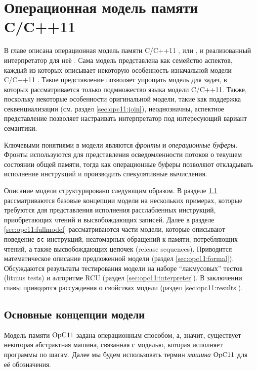 \chapter{Операционная модель памяти C/C++11} \label{sec:opc11}
В главе описана операционная модель памяти C/C++11 \cite{Podkopaev-al:CoRR16}, или \OpCpp,
и реализованный интерпретатор для неё \cite{opCppCode}.
Сама модель представлена как семейство аспектов, каждый из которых описывает некоторую особенность
изначальной модели C/C++11 \cite{Batty-al:POPL11}.
Такое представление позволяет упрощать модель для задач, в которых рассматривается только подмножество
языка модели C/C++11.
Также, поскольку некоторые особенности оригинальной модели, такие как поддержка секвенциализации (см. раздел \ref{sec:opc11:join}),
неоднозначны, аспектное представление позволяет настраивать интерпретатор под интересующий вариант семантики.

Ключевыми понятиями в модели являются \emph{фронты} и \emph{операционные буферы}.
Фронты используются для представления осведомленности потоков о текущем состоянии общей памяти,
тогда как операционные буферы позволяют откладывать исполнение инструкций и
производить спекулятивные вычисления.


Описание модели структурировано следующим образом.
В разделе \ref{sec:opc11:base} рассматриваются базовые концепции модели на нескольких примерах,
которые требуются для представления исполнения расслабленных инструкций, приобретающих чтений и
высвобождающих записей.
Далее в разделе \ref{sec:opc11:fullmodel} рассматриваются части модели, которые описывают
поведение ${\mathtt{sc}}$-инструкций, неатомарных обращений к памяти, потребляющих чтений, а также
высвобождающих цепочек (release sequences).
Приводится математическое описание предложенной модели (раздел \ref{sec:opc11:formal}).
Обсуждаются результаты тестирования модели на наборе ``лакмусовых'' тестов (litmus tests) и
алгоритме RCU (раздел \ref{sec:opc11:interpreter}).
В заключении главы приводятся рассуждения о свойствах модели (раздел \ref{sec:opc11:results}).

\section{Основные концепции модели}
\label{sec:opc11:base}
Модель памяти $\mathrm{OpC11}$ задана операционным способом, а, значит, существует
некоторая абстрактная машина, связанная с моделью, которая исполняет программы
по шагам. Далее мы будем использовать термин \emph{машина} $\mathrm{OpC11}$ для её обозначения.

